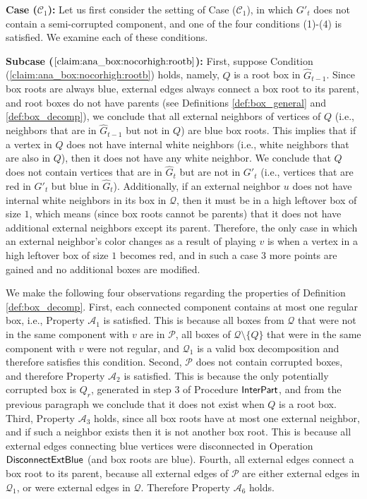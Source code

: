 \documentclass[11pt]{article}
\theoremstyle{definition}
\def\decomponereg{\mathcal{A}_1}
\def\decomponecorr{\mathcal{A}_2}
\def\decomproot{\mathcal{A}_3}
\def\decompedges{\mathcal{A}_6}
\def\boxpropnocorhigh{\mathcal{C}_1}
\def\interpart{\mbox{\sf InterPart}}
\def\discblue{\mbox{\sf DisconnectExtBlue}}
\begin{document}
\bigskip
\par\noindent
{\bf Case ($\boxpropnocorhigh$):}
Let us first consider the setting of Case ($\boxpropnocorhigh$), in which $G'_t$ does not contain a semi-corrupted component, and one of the four conditions (1)-(4) is satisfied.
We examine each of these conditions.
\smallskip
\par\noindent
{\bf Subcase ($\ref{claim:ana_box:nocorhigh:rootb}$):}
	First, suppose Condition (\ref{claim:ana_box:nocorhigh:rootb}) holds, namely, $Q$ is a root box in $\hat{G}_{t-1}$. 
	Since box roots are always blue, external edges always connect a box root to its parent, and root boxes do not have parents (see Definitions \ref{def:box_general} and \ref{def:box_decomp}),
	we conclude that all external neighbors of vertices of $Q$ (i.e., neighbors that are in $\hat{G}_{t-1}$ but not in $Q$) are blue box roots.
	This implies that if a vertex in $Q$ does not have internal white neighbors (i.e., white neighbors that are also in $Q$), then it does not have any white neighbor.
	We conclude that $Q$ does not contain vertices that are in $\hat{G}_t$ but are not in $G'_t$ (i.e., vertices that are red in $G'_t$ but blue in $\hat{G}_t$). 
	Additionally, if an external neighbor $u$ does not have internal white neighbors in its box in $\mathcal{Q}$, then it must be in a high leftover box of size $1$, 
	which means (since box roots cannot be parents) that it does not have additional external neighbors except its parent.
	Therefore, the only case in which an external neighbor's color changes as a result of playing $v$ is when a vertex in a high leftover box of size $1$ becomes red, and in such a case $3$ more points are gained and no additional boxes are modified.
	
	We make the following four observations regarding the properties of Definition \ref{def:box_decomp}.
	First, each connected component contains at most one regular box, i.e., Property $\decomponereg$ is satisfied.
	This is because all boxes from $\mathcal{Q}$ that were not in the same component with $v$ are in $\mathcal{P}$, 
	all boxes of $\mathcal{Q} \setminus \{Q\}$ that were in the same component with $v$ were not regular,
	and $\mathcal{Q}_1$ is a valid box decomposition and therefore satisfies this condition.	
	Second, $\mathcal{P}$ does not contain corrupted boxes, and therefore Property $\decomponecorr$ is satisfied.
	This is because the only potentially corrupted box is $Q_r$, generated in step $3$ of Procedure $\interpart$, and from the previous paragraph we conclude that it does not exist when $Q$ is a root box. 
	Third, Property $\decomproot$ holds, since all box roots have at most one external neighbor, and if such a neighbor exists then it is not another box root.
	This is because all external edges connecting blue vertices were disconnected in Operation $\discblue$ (and box roots are blue).
	Fourth, all external edges connect a box root to its parent, 	
	because all external edges of $\mathcal{P}$ are either external edges in $\mathcal{Q}_1$, or were external edges in $\mathcal{Q}$.  
	Therefore Property $\decompedges$ holds.
\end{document}
